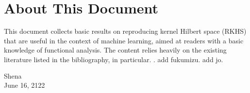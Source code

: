\documentclass[a4paper,12pt]{article}
\begin{document}
\section*{About This Document}
This document collects basic results on reproducing kernel Hilbert space (RKHS) that are useful in the context of machine learning, aimed at readers with a basic knowledge of functional analysis. The content relies heavily on the existing literature listed in the bibliography, in particular\cite{Berlinet:RKHS}\cite{Christmann-Steinwart:SVM}.
\cite{Cucker-Zhou:Learning-Theory}
\cite{Paulsen-Raghupathi:Intro-RKHS}
\cite{Schlkopf-Smola:Learning-with-kernels}.
add fukumizu. add jo.
\begin{flushright}
	Shena\\
	June 16, 2122
\end{flushright}
\end{document}
